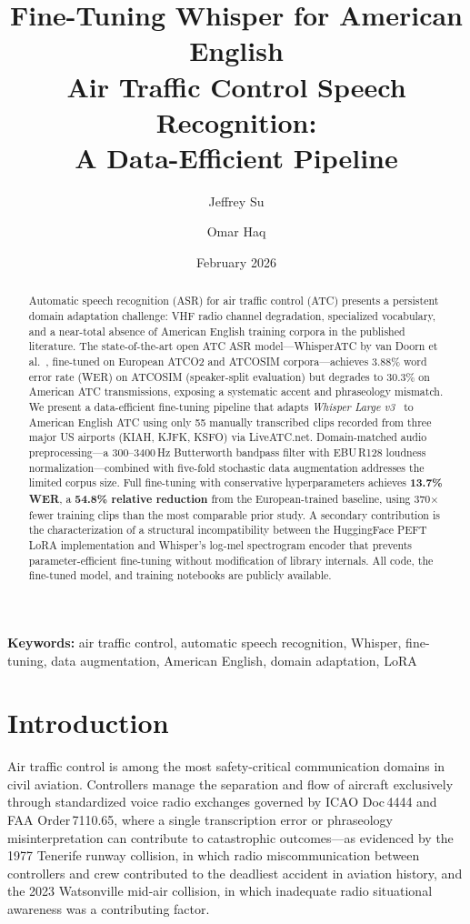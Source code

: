 \documentclass[11pt,a4paper]{article}
\title{\textbf{Fine-Tuning Whisper for American English\\
Air Traffic Control Speech Recognition:\\
A Data-Efficient Pipeline}}
\author[1]{Jeffrey Su}
\author[2]{Omar Haq}
\affil[1]{Undergraduate Student, Rice University\\ \small\texttt{js318@rice.edu}}
\affil[2]{Undergraduate Student, University of Michigan\\ \small\texttt{omarhaq@umich.edu}}
\affil[ ]{\small\url{https://github.com/jeffreysupergoodatcoding/liveatc-pipeline}\ $\cdot$\
\url{https://huggingface.co/jeffreysuu/whisper-atc-finetuned}}
\date{February 2026}
\begin{document}
\maketitle

\begin{abstract}
Automatic speech recognition (ASR) for air traffic control (ATC) presents
a persistent domain adaptation challenge: VHF radio channel degradation,
specialized vocabulary, and a near-total absence of American English training
corpora in the published literature.
The state-of-the-art open ATC ASR model---WhisperATC by van Doorn et
al.~\cite{vandoorn2024whisperatc}, fine-tuned on European ATCO2 and ATCOSIM
corpora---achieves 3.88\% word error rate (WER) on ATCOSIM (speaker-split
evaluation) but degrades to 30.3\% on American ATC transmissions, exposing a
systematic accent and phraseology mismatch.
We present a data-efficient fine-tuning pipeline that adapts \textit{Whisper
Large v3}~\cite{radford2023whisper} to American English ATC using only 55
manually transcribed clips recorded from three major US airports (KIAH, KJFK,
KSFO) via LiveATC.net.
Domain-matched audio preprocessing---a 300--3400\,Hz Butterworth bandpass
filter with EBU\,R128 loudness normalization---combined with five-fold
stochastic data augmentation addresses the limited corpus size.
Full fine-tuning with conservative hyperparameters achieves \textbf{13.7\%
WER}, a \textbf{54.8\% relative reduction} from the European-trained baseline,
using 370$\times$ fewer training clips than the most comparable prior study.
A secondary contribution is the characterization of a structural incompatibility
between the HuggingFace PEFT LoRA implementation and Whisper's log-mel
spectrogram encoder that prevents parameter-efficient fine-tuning without
modification of library internals.
All code, the fine-tuned model, and training notebooks are publicly available.
\end{abstract}

\noindent\textbf{Keywords:} air traffic control, automatic speech recognition,
Whisper, fine-tuning, data augmentation, American English, domain adaptation,
LoRA

\section{Introduction}

Air traffic control is among the most safety-critical communication domains in
civil aviation. Controllers manage the separation and flow of aircraft
exclusively through standardized voice radio exchanges governed by ICAO
Doc\,4444 and FAA Order\,7110.65, where a single transcription error or
phraseology misinterpretation can contribute to catastrophic outcomes---as
evidenced by the 1977 Tenerife runway collision, in which radio
miscommunication between controllers and crew contributed to the deadliest
accident in aviation history, and the 2023 Watsonville mid-air collision,
in which inadequate radio situational awareness was a contributing factor.
\end{document}
